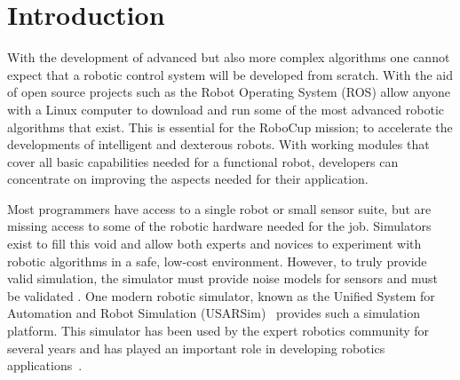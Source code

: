 \section{Introduction}
With the development of  advanced but also more complex algorithms one cannot expect that a robotic control system will be developed from scratch.
With the aid of open source projects such as the Robot Operating System (ROS)
\cite{Quigley2009} allow anyone with a Linux computer to download and run some of the most advanced robotic algorithms that exist.
This is essential for the RoboCup mission; to accelerate the developments of intelligent and dexterous robots.
With working modules that cover all basic capabilities needed for a functional robot, developers can concentrate on improving the aspects needed for their application.

Most programmers have access to a single robot or small sensor suite, but are missing access to some of the robotic hardware needed for the job. 
Simulators exist to fill this void and allow both experts and novices to experiment with robotic algorithms in a safe, low-cost environment. However, to truly provide valid simulation, the simulator must provide noise models for sensors and must be validated \cite{BALAGUER.IROS.2008,vanNoort2012permis,okamoto2008validation,Pepper2007permis,WANG.HFES.2005}. 
One modern robotic simulator, known as the Unified System for Automation and Robot Simulation (USARSim)~\cite{BALAGUER.IROS.2008}
provides such a simulation platform. 
This simulator has been used by the expert robotics community for several years and has played an important role in developing robotics applications~\cite{Balakirsky2009iros}. 

